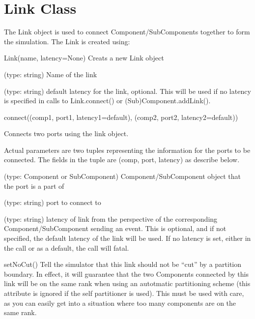 \section{Link Class}

The Link object is used to connect Component/SubComponents together to
form the simulation.  The Link is created using:

\begin{functiondoc}{Link(name, latency=None)}{
    Creats a new Link object
}

   (type: string) Name of the link

   (type: string) default latency for the link,
  optional.  This will be used if no latency is specified in calls to
  Link.connect() or (Sub)Component.addLink().


\end{functiondoc}


\begin{functiondoc}{connect((comp1, port1, latency1=default), (comp2, port2, latency2=default))}{

    Connects two ports using the link object.

    Actual parameters are two tuples representing the information for
    the ports to be connected.  The fields in the tuple are (comp,
    port, latency) as describe below.

}

   (type: Component or SubComponent)
  Component/SubComponent object that the port is a part of

   (type: string) port to connect to

   (type: string) latency of link from the perspective
  of the corresponding Component/SubComponent sending an event.  This
  is optional, and if not specified, the default latency of the link
  will be used.  If no latency is set, either in the call or as a
  default, the call will fatal.

  \noreturn

\end{functiondoc}


\begin{functiondoc}{setNoCut()}{
    Tell the simulator that this link should not be “cut” by a
    partition boundary.  In effect, it will guarantee that the two
    Components connected by this link will be on the same rank when
    using an autotmatic partitioning scheme (this attribute is ignored
    if the self partitioner is used).  This must be used with care, as
    you can easily get into a situation where too many components are
    on the same rank.  }

  \noreturn
\end{functiondoc}
